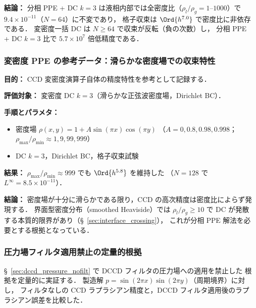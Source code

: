 \noindent\textbf{結論：}
分相 PPE + DC $k{=}3$ は液相内部では全密度比（$\rho_l/\rho_g = 1$--$1000$）で
$9.4 \times 10^{-11}$（$N = 64$）に不変であり，
格子収束は $\Ord{h^{7.0}}$ で密度比に非依存である．
変密度一括 DC は $N \geq 64$ で収束が反転（負の次数）し，
分相 PPE + DC $k{=}3$ 比で $5.7 \times 10^7$ 倍低精度である．


\subsubsection{変密度 PPE の参考データ：滑らかな密度場での収束特性}
\label{sec:verify_ppe_varrho}
\label{sec:varrho_ppe_limitation}%

\noindent\textbf{目的：}
CCD 変密度演算子自体の精度特性を参考として記録する．

\noindent\textbf{評価対象：}
変密度 DC $k{=}3$（滑らかな正弦波密度場，Dirichlet BC）．

\noindent\textbf{手順とパラメタ：}
\begin{itemize}[noitemsep]
  \item 密度場 $\rho(x,y) = 1 + A\sin(\pi x)\cos(\pi y)$
        （$A = 0, 0.8, 0.98, 0.998$；$\rho_{\max}/\rho_{\min} \approx 1, 9, 99, 999$）
  \item DC $k{=}3$，Dirichlet BC，格子収束試験
\end{itemize}

\noindent\textbf{結果：}
$\rho_{\max}/\rho_{\min} \approx 999$ でも $\Ord{h^{5.8}}$ を維持した
（$N=128$ で $L^\infty = 8.5 \times 10^{-11}$）．

\noindent\textbf{結論：}
密度場が十分に滑らかである限り，CCD の高次精度は密度比によらず発現する．
界面型密度分布（smoothed Heaviside）では $\rho_l/\rho_g \geq 10$ で
DC が発散する本質的限界があり（§~\ref{sec:interface_crossing}），
これが分相 PPE 解法を必要とする根拠となっている．

\subsubsection{圧力場フィルタ適用禁止の定量的根拠}
\label{sec:verify_pressure_filter}

§~\ref{sec:dccd_pressure_nofilt} で DCCD フィルタの圧力場への適用を禁止した
根拠を定量的に実証する．
製造解 $p = \sin(2\pi x)\sin(2\pi y)$（周期境界）に対し，
フィルタなしの CCD ラプラシアン精度と，DCCD フィルタ適用後のラプラシアン誤差を比較した．


